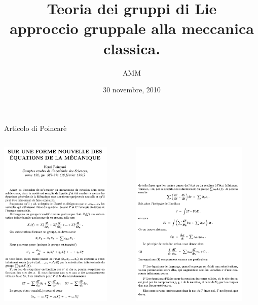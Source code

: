 \documentclass[unknownkeysallowed]{beamer}
\title[Le equazioni di Eulero Poincare']{ Teoria dei gruppi di Lie \\ approccio gruppale alla meccanica classica.}
\author{AMM}
\institute{Universita' Milano Bicocca}
\date{30 novembre, 2010}
\begin{document}
\begin{frame}
\titlepage
\end{frame}

\begin{frame}{Articolo di Poincarè}
\begin{columns}
\begin{column}[l]{.5\textwidth}
\includegraphics[height=8cm]{Articolo/poincare_epag1}
\end{column}
\begin{column}[r]{.5\textwidth}
\includegraphics[height=8cm]{Articolo/poincare_epag2}
\end{column}
\end{columns}
\end{frame}
\end{document}
